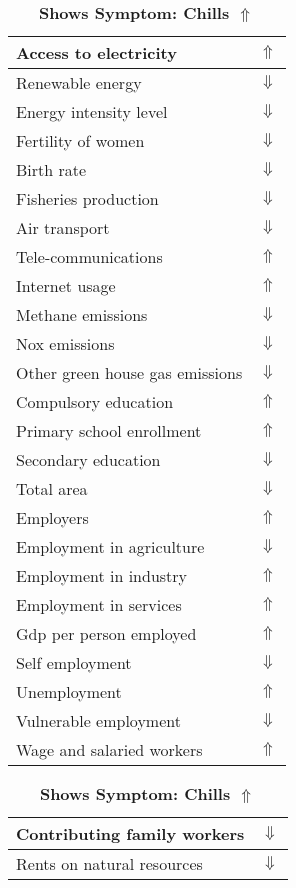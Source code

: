 \documentclass[12pt,notitlepage,oneside]{report}
\begin{document}
\begin{table}[!htb]
\caption{\textbf{Shows Symptom: Chills $\Uparrow$}}
\centering
\label{Correlated Socio-economic Factors0}
\begin{tabular}{|l|l|}
\hline
Access to electricity & $\Uparrow$\\ \hline
Renewable energy & $\Downarrow$\\ \hline
Energy intensity level & $\Downarrow$\\ \hline
Fertility of women & $\Downarrow$\\ \hline
Birth rate & $\Downarrow$\\ \hline
Fisheries production & $\Downarrow$\\ \hline
Air transport  & $\Downarrow$\\ \hline
Tele-communications & $\Uparrow$\\ \hline
Internet usage & $\Uparrow$\\ \hline
Methane emissions & $\Downarrow$\\ \hline
Nox emissions & $\Downarrow$\\ \hline
Other green house gas emissions & $\Downarrow$\\ \hline
Compulsory education & $\Uparrow$\\ \hline
Primary school enrollment & $\Uparrow$\\ \hline
Secondary education & $\Downarrow$\\ \hline
Total area & $\Downarrow$\\ \hline
Employers & $\Uparrow$\\ \hline
Employment in agriculture & $\Downarrow$\\ \hline
Employment in industry & $\Uparrow$\\ \hline
Employment in services & $\Uparrow$\\ \hline
Gdp per person employed & $\Uparrow$\\ \hline
Self employment & $\Downarrow$\\ \hline
Unemployment & $\Uparrow$\\ \hline
Vulnerable employment & $\Downarrow$\\ \hline
Wage and salaried workers & $\Uparrow$\\ \hline
\end{tabular}
\begin{tabular}{|l|l|}
\hline
Contributing family workers & $\Downarrow$\\ \hline
Rents on natural resources & $\Downarrow$\\ \hline

\end{tabular}
\end{table}
\end{document}
